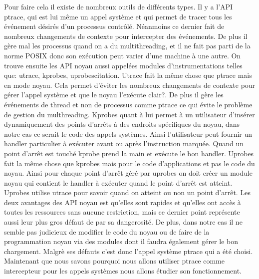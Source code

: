 Pour faire cela il existe de nombreux outils de différents types. Il y a l'API
ptrace, qui est lui même un appel système et qui permet de tracer tous les
événement désirés d'un processus contrôlé. Néanmoins ce dernier fait de nombreux
changements de contexte pour intercepter des événements. De plus il gère mal les
processus quand on a du multithreading, et il ne fait pas parti de la norme
POSIX donc son exécution peut varier d'une machine à une autre. On trouve
ensuite les API noyau aussi appelées modules d'instrumentations telles que:
utrace, kprobes, uprobes{\color{red}citation}. Utrace fait la même chose que
ptrace mais en mode noyau. Cela permet d'éviter les nombreux changements de
contexte pour gérer l'appel système et que le noyau l'exécute {\color{green}
  clair?}. De plus il gère les événements de thread et non de processus comme
ptrace ce qui évite le problème de gestion du multhreading. Kprobes quant à lui
permet à un utilisateur d’insérer dynamiquement des points d'arrêts à des
endroits spécifiques du noyau, dans notre cas ce serait le code des appels
systèmes. Ainsi l’utilisateur peut fournir un handler particulier à exécuter
avant ou après l’instruction marquée. Quand un point d'arrêt est touché kprobe
prend la main et exécute le bon handler. Uprobes fait la même chose que kprobes
mais pour le code d'applications et pas le code du noyau. Ainsi pour chaque
point d'arrêt géré par uprobes on doit créer un module noyau qui contient le
handler à exécuter quand le point d'arrêt est atteint. Uprobes utilise utrace
pour savoir quand on atteint ou non un point d'arrêt. Les deux avantages des API
noyau est qu'elles sont rapides et qu'elles ont accès à toutes les ressources
sans aucune restriction, mais ce dernier point représente aussi leur plus gros
défaut de par sa dangerosité. De plus, dans notre cas il ne semble pas judicieux
de modifier le code du noyau ou de faire de la programmation noyau via des
modules dont il faudra également gérer le bon chargement. Malgrè ses défauts
c'est donc l'appel système ptrace qui a été choisi. Maintenant que nous savons
pourquoi nous allons utiliser ptrace comme intercepteur pour les appels systèmes
nous allons étudier son fonctionnement.

